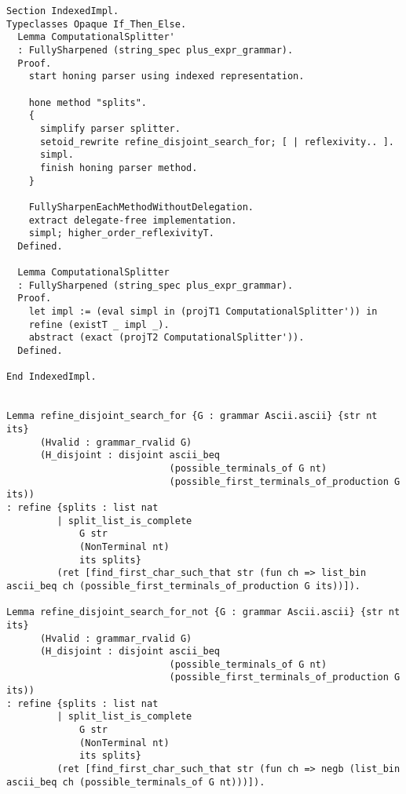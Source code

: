 \begin{verbatim}
Section IndexedImpl.
Typeclasses Opaque If_Then_Else.
  Lemma ComputationalSplitter'
  : FullySharpened (string_spec plus_expr_grammar).
  Proof.
    start honing parser using indexed representation.

    hone method "splits".
    {
      simplify parser splitter.
      setoid_rewrite refine_disjoint_search_for; [ | reflexivity.. ].
      simpl.
      finish honing parser method.
    }

    FullySharpenEachMethodWithoutDelegation.
    extract delegate-free implementation.
    simpl; higher_order_reflexivityT.
  Defined.

  Lemma ComputationalSplitter
  : FullySharpened (string_spec plus_expr_grammar).
  Proof.
    let impl := (eval simpl in (projT1 ComputationalSplitter')) in
    refine (existT _ impl _).
    abstract (exact (projT2 ComputationalSplitter')).
  Defined.

End IndexedImpl.
  
  
Lemma refine_disjoint_search_for {G : grammar Ascii.ascii} {str nt its}
      (Hvalid : grammar_rvalid G)
      (H_disjoint : disjoint ascii_beq
                             (possible_terminals_of G nt)
                             (possible_first_terminals_of_production G its))
: refine {splits : list nat
         | split_list_is_complete
             G str
             (NonTerminal nt)
             its splits}
         (ret [find_first_char_such_that str (fun ch => list_bin ascii_beq ch (possible_first_terminals_of_production G its))]).

Lemma refine_disjoint_search_for_not {G : grammar Ascii.ascii} {str nt its}
      (Hvalid : grammar_rvalid G)
      (H_disjoint : disjoint ascii_beq
                             (possible_terminals_of G nt)
                             (possible_first_terminals_of_production G its))
: refine {splits : list nat
         | split_list_is_complete
             G str
             (NonTerminal nt)
             its splits}
         (ret [find_first_char_such_that str (fun ch => negb (list_bin ascii_beq ch (possible_terminals_of G nt)))]).

\end{verbatim}